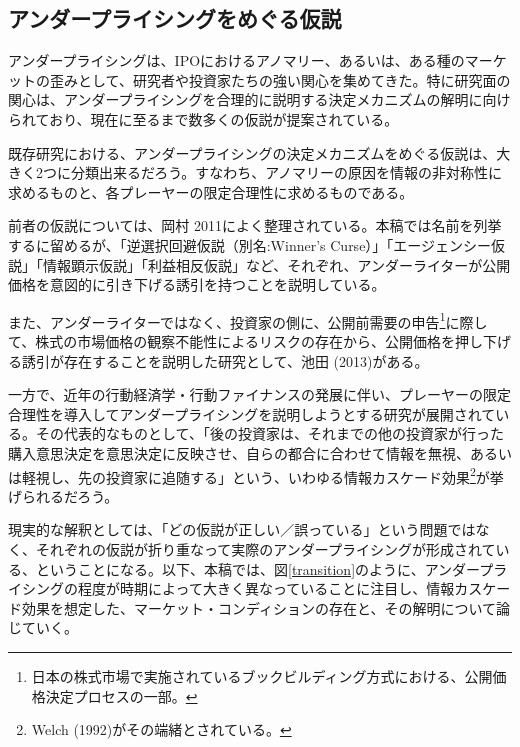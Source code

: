 \documentclass{jsarticle}
\begin{document}
\subsection{アンダープライシングをめぐる仮説}
アンダープライシングは、IPOにおけるアノマリー、あるいは、ある種のマーケットの歪みとして、研究者や投資家たちの強い関心を集めてきた。特に研究面の関心は、アンダープライシングを合理的に説明する決定メカニズムの解明に向けられており、現在に至るまで数多くの仮説が提案されている。\par
既存研究における、アンダープライシングの決定メカニズムをめぐる仮説は、大きく2つに分類出来るだろう。すなわち、アノマリーの原因を情報の非対称性に求めるものと、各プレーヤーの限定合理性に求めるものである。\par
前者の仮説については、岡村 2011\cite{okamura}によく整理されている。本稿では名前を列挙するに留めるが、「逆選択回避仮説（別名:Winner's Curse）」「エージェンシー仮説」「情報顕示仮説」「利益相反仮説」など、それぞれ、アンダーライターが公開価格を意図的に引き下げる誘引を持つことを説明している。\par

また、アンダーライターではなく、投資家の側に、公開前需要の申告\footnote[5]{日本の株式市場で実施されているブックビルディング方式における、公開価格決定プロセスの一部。}に際して、株式の市場価格の観察不能性によるリスクの存在から、公開価格を押し下げる誘引が存在することを説明した研究として、池田 (2013)\cite{ikeda}がある。\par

一方で、近年の行動経済学・行動ファイナンスの発展に伴い、プレーヤーの限定合理性を導入してアンダープライシングを説明しようとする研究が展開されている。その代表的なものとして、「後の投資家は、それまでの他の投資家が行った購入意思決定を意思決定に反映させ、自らの都合に合わせて情報を無視、あるいは軽視し、先の投資家に追随する」という、いわゆる情報カスケード効果\footnote[6]{Welch (1992)\cite{Welch}がその端緒とされている。}が挙げられるだろう。\par




現実的な解釈としては、「どの仮説が正しい／誤っている」という問題ではなく、それぞれの仮説が折り重なって実際のアンダープライシングが形成されている、ということになる。以下、本稿では、図\ref{transition}のように、アンダープライシングの程度が時期によって大きく異なっていることに注目し、情報カスケード効果を想定した、マーケット・コンディションの存在と、その解明について論じていく。
\end{document}

